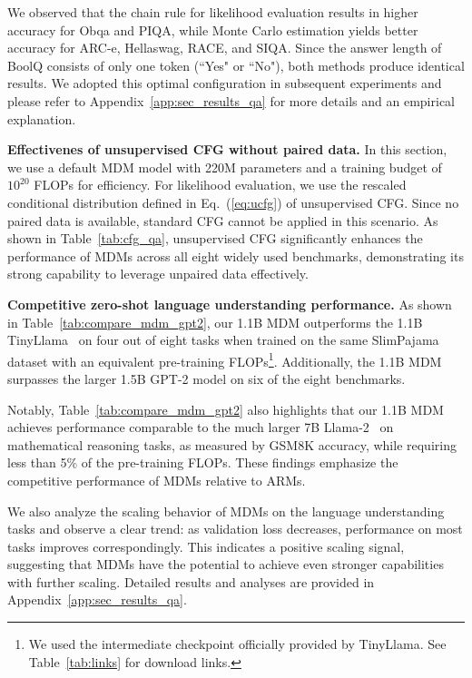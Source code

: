 \documentclass{article} %
\begin{document}
We observed that the chain rule for likelihood evaluation results in higher accuracy for Obqa and PIQA, while Monte Carlo estimation yields better accuracy for ARC-e, Hellaswag, RACE, and SIQA. Since the answer length of BoolQ consists of only one token (``Yes" or ``No"), both methods produce identical results. We adopted this optimal configuration in subsequent experiments and please refer to Appendix~\ref{app:sec_results_qa} for more details and an empirical explanation.



\textbf{Effectivenes of unsupervised CFG without paired data.} In this section, we use a default MDM model with 220M parameters and a training budget of $10^{20}$ FLOPs for efficiency. For likelihood evaluation, we use the rescaled conditional distribution defined in Eq.~(\ref{eq:ucfg}) of unsupervised CFG. Since no paired data is available, standard CFG cannot be applied in this scenario.
As shown in Table~\ref{tab:cfg_qa}, unsupervised CFG significantly enhances the performance of MDMs across all eight widely used benchmarks, demonstrating its strong capability to leverage unpaired data effectively.

\textbf{Competitive zero-shot language understanding performance.} 
As shown in Table~\ref{tab:compare_mdm_gpt2}, our 1.1B MDM outperforms the 1.1B TinyLlama~\citep{zhang2024tinyllama} on four out of eight tasks when trained on the same SlimPajama dataset with an equivalent pre-training FLOPs\footnote{We used the intermediate checkpoint officially provided by TinyLlama. See Table~\ref{tab:links} for download links.}. Additionally, the 1.1B MDM surpasses the larger 1.5B GPT-2 model on six of the eight benchmarks.

Notably, Table~\ref{tab:compare_mdm_gpt2} also highlights that our 1.1B MDM achieves performance comparable to the much larger 7B Llama-2~\citep{touvron2023llama2} on mathematical reasoning tasks, as measured by GSM8K accuracy, while requiring less than 5\% of the pre-training FLOPs. These findings emphasize the competitive performance of MDMs relative to ARMs.

We also analyze the scaling behavior of MDMs on the language understanding tasks and observe a clear trend: as validation loss decreases, performance on most tasks improves correspondingly. This indicates a positive scaling signal, suggesting that MDMs have the potential to achieve even stronger capabilities with further scaling. Detailed results and analyses are provided in Appendix~\ref{app:sec_results_qa}.
\end{document}
